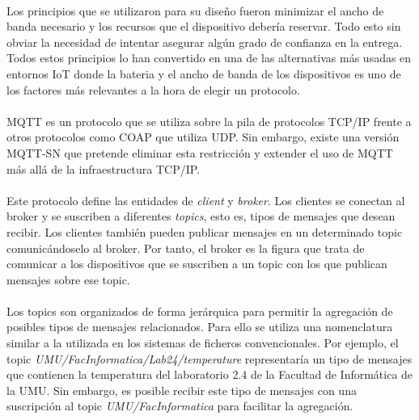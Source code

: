 \documentclass[12pt, a4paper]{article}
\begin{document}
        \paragraph{}
        Los principios que se utilizaron para su diseño fueron minimizar el ancho de banda necesario y los recursos que el dispositivo debería reservar. Todo esto sin obviar la necesidad de intentar asegurar algún grado de confianza en la entrega. Todos estos principios lo han convertido en una de las alternativas más usadas en entornos IoT donde la bateria y el ancho de banda de los dispositivos es uno de los factores más relevantes a la hora de elegir un protocolo.

        \paragraph{}
        MQTT es un protocolo que se utiliza sobre la pila de protocolos TCP/IP frente a otros protocolos como COAP que utiliza UDP. Sin embargo, existe una versión MQTT-SN que pretende eliminar esta restricción y extender el uso de MQTT más allá de la infraestructura TCP/IP.

        \paragraph{}
        Este protocolo define las entidades de \textit{client} y \textit{broker}. Los clientes se conectan al broker y se suscriben a diferentes \textit{topics}, esto es, tipos de mensajes que desean recibir. Los clientes también pueden publicar mensajes en un determinado topic comunicándoselo al broker. Por tanto, el broker es la figura que trata de comunicar a los dispositivos que se suscriben a un topic con los que publican mensajes sobre ese topic.

        \paragraph{}
        Los topics son organizados de forma jerárquica para permitir la agregación de posibles tipos de mensajes relacionados. Para ello se utiliza una nomenclatura similar a la utilizada en los sistemas de ficheros convencionales. Por ejemplo, el topic \textit{UMU/FacInformatica/Lab24/temperature} representaría un tipo de mensajes que contienen la temperatura del laboratorio 2.4 de la Facultad de Informática de la UMU. Sin embargo, es posible recibir este tipo de mensajes con una suscripción al topic \textit{UMU/FacInformatica} para facilitar la agregación.
\end{document}
